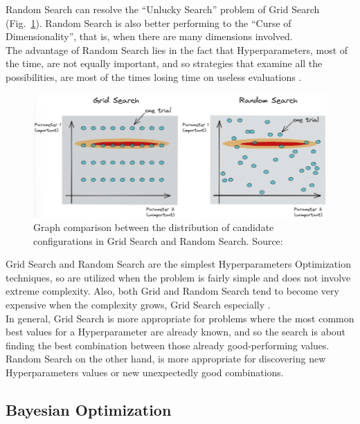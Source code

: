 Random Search can resolve the “Unlucky Search” problem of Grid Search (Fig.~\ref{fig:figure-2.2.5}).
Random Search is also better performing to the “Curse of Dimensionality”, that is, when there are many dimensions involved.
\\[0.3cm]The advantage of Random Search lies in the fact that Hyperparameters, most of the time, are not equally important, and so strategies that examine all the possibilities, are most of the times losing time on useless evaluations \cite{Tesi-1.2}.
\begin{figure}[t]
	\centering
	\includegraphics[width=15cm]{figures/figure-2.2.5.png}
	\caption[Grid Search and Random Search Comparison]{Graph comparison between the distribution of candidate configurations in Grid Search and Random Search. Source:~\cite{Tesi-1.3}}
	\label{fig:figure-2.2.5}
\end{figure}

Grid Search and Random Search are the simplest Hyperparameters Optimization techniques, so are utilized when the problem is fairly simple and does not involve extreme complexity.
Also, both Grid and Random Search tend to become very expensive when the complexity grows, Grid Search especially \cite{Tesi-1.4}.
\\[0.3cm]In general, Grid Search is more appropriate for problems where the most common best values for a Hyperparameter are already known, and so the search is about finding the best combination between those already good-performing values.
\\[0.3cm]Random Search on the other hand, is more appropriate for discovering new Hyperparameters values or new unexpectedly good combinations.

\subsection{Bayesian Optimization}

